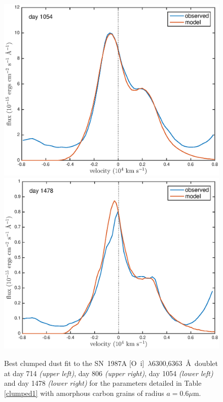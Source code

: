 \documentclass[useAMS,usenatbib,usegraphicx]{mnras}
\begin{document}
\begin{figure}
\begin{center}
\includegraphics[trim =33 10 45 15,clip=true,scale=0.47]{clump_1/best_fit/d1054OI}
\includegraphics[trim =33 10 45 15,clip=true,scale=0.47]{clump_1/best_fit/d1478OI}
\caption{Best clumped dust fit to the SN~1987A [O~{\sc i}]~$\lambda$6300,6363~\AA\ doublet at day 714 \textit{(upper left)}, day 806 \textit{(upper right)}, day 1054 \textit{(lower left)} and day 1478 \textit{(lower right)} for the parameters detailed in Table \ref{clumped1} with amorphous carbon grains of radius $a=0.6 \mu$m.}
\label{OI_clump1}
\end{center}
\end{figure}
\end{document}
